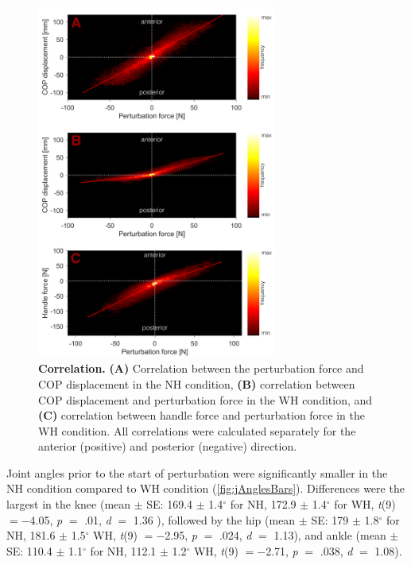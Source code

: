 \clearpage
\begin{figure}[!htb]
	\centering
	\includegraphics[width=0.7\textwidth]{Jernej/figures/corr}
	\caption{\textbf{Correlation. }\textbf{(A)} Correlation between the perturbation force and COP displacement in the NH condition, \textbf{(B)} correlation between COP displacement and perturbation force in the WH condition, and \textbf{(C)} correlation between handle force and perturbation force in the WH condition.  All correlations were calculated separately for the anterior (positive) and posterior (negative) direction.
	}
	\label{fig:corr}
\end{figure}

Joint angles prior to the start of perturbation were significantly smaller in the NH condition compared to WH condition (\FigureAbbr \ref{fig:jAnglesBars}). Differences were the largest in the knee (mean $\pm$ SE: 169.4 $\pm$ 1.4$^{\circ}$ for NH, 172.9 $\pm$ 1.4$^{\circ}$ for WH, \textit{t}(9) $= -$4.05, \textit{p} $=$ .01, \textit{d} $=$ 1.36 ), followed by the hip (mean $\pm$ SE: 179 $\pm$ 1.8$^{\circ}$ for NH, 181.6 $\pm$ 1.5$^{\circ}$ WH, \textit{t}(9) $= -$2.95, \textit{p} $=$ .024, \textit{d} $=$ 1.13), and ankle (mean $\pm$ SE: 110.4 $\pm$ 1.1$^{\circ}$ for NH, 112.1 $\pm$ 1.2$^{\circ}$ WH, \textit{t}(9) $= -$2.71, \textit{p} $=$ .038, \textit{d} $=$ 1.08).


